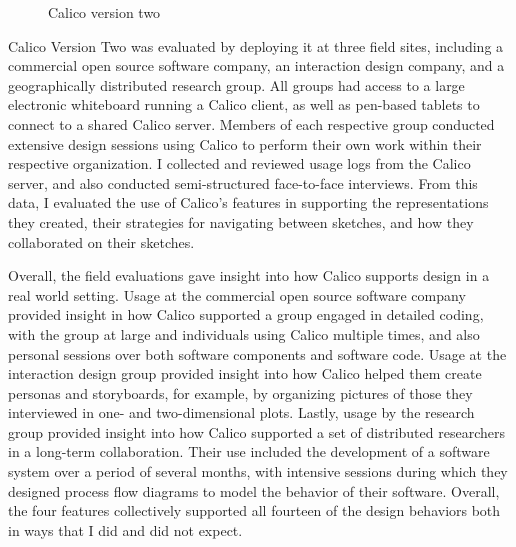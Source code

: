 \documentclass[12pt,fleqn]{ucithesis}
\begin{document}
\begin{figure}
  \centering
   \caption {Calico version two}
   \label{fig:calico-version-two}
\end{figure}

Calico Version Two was evaluated by deploying it at three field sites, including a commercial open source software company, an interaction design company, and a geographically distributed research group. All groups had access to a large electronic whiteboard running a Calico client, as well as pen-based tablets to connect to a shared Calico server. Members of each respective group conducted extensive design sessions using Calico to perform their own work within their respective organization. I collected and reviewed usage logs from the Calico server, and also conducted semi-structured face-to-face interviews. From this data, I evaluated the use of Calico's features in supporting the representations they created, their strategies for navigating between sketches, and how they collaborated on their sketches. 

Overall, the field evaluations gave insight into how Calico supports design in a real world setting. Usage at the commercial open source software company provided insight in how Calico supported a group engaged in detailed coding, with the group at large and individuals using Calico multiple times, and also personal sessions over both software components and software code. Usage at the interaction design group provided insight into how Calico helped them create personas and storyboards, for example, by organizing pictures of those they interviewed in one- and two-dimensional plots. Lastly, usage by the research group provided insight into how Calico supported a set of distributed researchers in a long-term collaboration. Their use included the development of a software system over a period of several months, with intensive sessions during which they designed process flow diagrams to model the behavior of their software. Overall, the four features collectively supported all fourteen of the design behaviors both in ways that I did and did not expect. 
\end{document}
